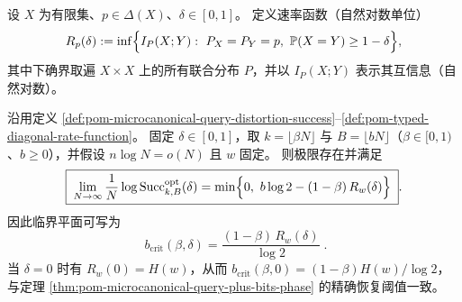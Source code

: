 \begin{definition}[定型—对角约束速率函数]\label{def:pom-typed-diagonal-rate-function}
设 \(X\) 为有限集、\(p\in\Delta(X)\)、\(\delta\in[0,1]\)。
定义速率函数（自然对数单位）
\[
R_p(\delta)
:=\inf\Bigl\{I_P(X;Y):\ P_X=P_Y=p,\ \mathbb{P}(X=Y)\ge 1-\delta\Bigr\},
\]
其中下确界取遍 \(X\times X\) 上的所有联合分布 \(P\)，并以 \(I_P(X;Y)\) 表示其互信息（自然对数）。
\end{definition}

\begin{theorem}\label{thm:pom-microcanonical-query-distortion-strong-converse-plane}
沿用定义 \ref{def:pom-microcanonical-query-distortion-success}--\ref{def:pom-typed-diagonal-rate-function}。
固定 \(\delta\in[0,1]\)，取 \(k=\lfloor\beta N\rfloor\) 与 \(B=\lfloor bN\rfloor\)（\(\beta\in[0,1)\)、\(b\ge 0\)），并假设 \(n\log N=o(N)\) 且 \(w\) 固定。
则极限存在并满足
\[
\boxed{\;
\lim_{N\to\infty}\frac{1}{N}\log \mathrm{Succ}^{\mathrm{opt}}_{k,B}(\delta)
=\min\Bigl\{0,\ b\log 2-(1-\beta)\,R_w(\delta)\Bigr\}\; }.
\]
因此临界平面可写为
\[
\boxed{\;
b_{\mathrm{crit}}(\beta,\delta)=\frac{(1-\beta)\,R_w(\delta)}{\log 2}\; } .
\]
当 \(\delta=0\) 时有 \(R_w(0)=H(w)\)，从而 \(b_{\mathrm{crit}}(\beta,0)=(1-\beta)H(w)/\log 2\)，与定理 \ref{thm:pom-microcanonical-query-plus-bits-phase} 的精确恢复阈值一致。
\end{theorem}
